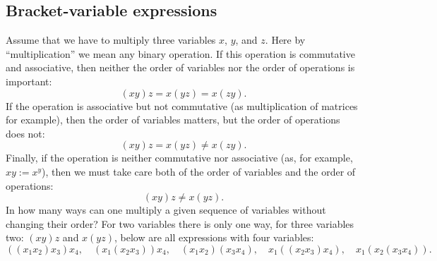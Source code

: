 \subsection{Bracket-variable expressions}
Assume that we have to multiply three variables $x$, $y$, and $z$.
Here by ``multiplication'' we mean any binary operation.
If this operation is commutative and associative, then neither the order of variables nor the order of operations is important:
\[
(xy)z = x(yz) = x(zy).
\]
If the operation is associative but not commutative (as multiplication of matrices for example),
then the order of variables matters, but the order of operations does not:
\[
(xy)z = x(yz) \ne x(zy).
\]
Finally, if the operation is neither commutative nor associative (as, for example, $xy := x^y$),
then we must take care both of the order of variables and the order of operations:
\[
(xy)z \ne x(yz).
\]
In how many ways can one multiply a given sequence of variables without changing their order?
For two variables there is only one way, for three variables two: $(xy)z$ and $x(yz)$,
below are all expressions with four variables:
\[
((x_1x_2)x_3)x_4, \quad (x_1(x_2x_3))x_4, \quad (x_1x_2)(x_3x_4), \quad x_1((x_2x_3)x_4), \quad x_1(x_2(x_3x_4)).
\]
